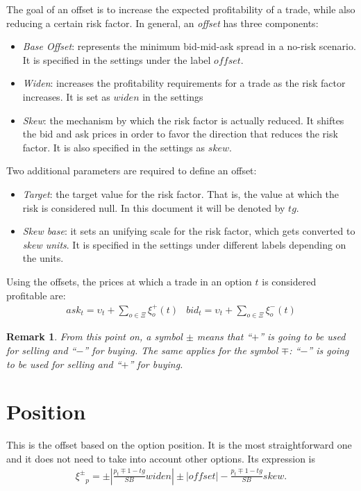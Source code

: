 \documentclass[10pt, a4paper, oneside]{article}
\def\ds{\displaystyle}
\newtheorem*{remark}{Remark}
\newcommand{\offsets}{\ensuremath{\Xi}}
\newcommand{\pos}{\ensuremath{p}}
\newcommand{\price}{\ensuremath{\upsilon}}
\newcommand{\offsetbs}{\ensuremath{\xi^{\pm}}}
\newcommand{\target}{\ensuremath{\mathit{tg}}}
\newcommand{\widen}{\ensuremath{\mathit{widen}}}
\newcommand{\skw}{\ensuremath{\mathit{skew}}}
\newcommand{\offset}{\ensuremath{\mathit{offset}}}
\newcommand{\skewunits}[3]{\ensuremath{\frac{{#1}\mp{#2}-\target}{{#3}}}}
\begin{document}
\noindent The goal of an offset is to increase the expected profitability of a trade, while also reducing a certain risk factor. In general, an \emph{offset} has three components:
\begin{itemize}
 \item \emph{Base Offset}: represents the minimum bid-mid-ask spread in a no-risk scenario. It is specified in the settings under the label $\offset$.
 \item \emph{Widen}: increases the profitability requirements for a trade as the risk factor increases. It is set as $\widen$ in the settings
 \item \emph{Skew}: the mechanism by which the risk factor is actually reduced. It shiftes the bid and ask prices in order to favor the direction that reduces the risk factor. It is also specified in the settings as $\skw$.
\end{itemize}

\noindent Two additional parameters are required to define an offset:
\begin{itemize}
 \item \emph{Target}: the target value for the risk factor. That is, the value at which the risk is considered null. In this document it will be denoted by $\target$.
 \item \emph{Skew base}: it sets an unifying scale for the risk factor, which gets converted to \emph{skew units}. It is specified in the settings under different labels depending on the units.
\end{itemize}

\noindent Using the offsets, the prices at which a trade in an option $t$ is considered profitable are:
\[\begin{matrix} \mathit{ask}_t=\price_t+\ds\sum_{o\in\offsets}\xi^+_o(t) & \mathit{bid}_t=\price_t+\ds\sum_{o\in\offsets}\xi^-_o(t) \end{matrix}\]

\begin{remark} From this point on, a symbol $\pm$ means that ``$+$\!'' is going to be used for selling and ``$-$\!'' for buying. The same applies for the symbol $\mp$: ``$-$\!'' is going to be used for selling and ``$+$\!'' for buying.
\end{remark}










\section{Position}
\noindent This is the offset based on the option position. It is the most straightforward one and it does not need to take into account other options. Its expression is
\newcommand{\posoffsetformulatemp}[2]{\ensuremath{\offsetbs_\pos=\pm\left|\skewunits{#1}{1}{#2}\widen\right| \pm \left|\offset\right| - \skewunits{#1}{1}{#2}\skw.}}
\begin{align*}\posoffsetformulatemp{\pos_t}{SB}\end{align*}
\end{document}
